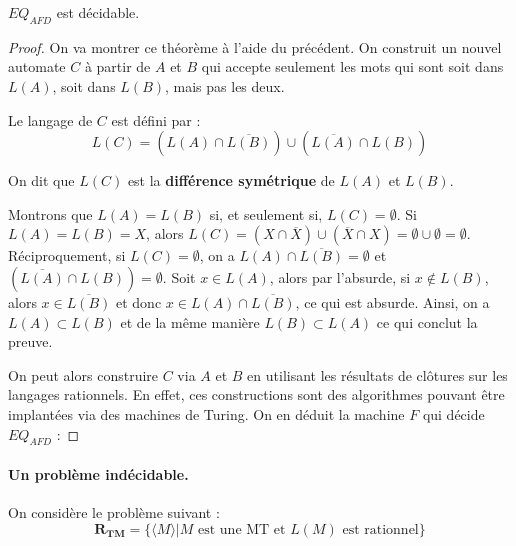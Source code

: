 \begin{theorem}
$EQ_{AFD}$ est décidable.
\end{theorem}

\begin{proof}
On va montrer ce théorème à l'aide du précédent. On construit un nouvel automate $C$ à partir de $A$ et $B$ qui accepte seulement les mots qui sont soit dans $L(A)$, soit dans $L(B)$, mais pas les deux.

Le langage de $C$ est défini par :
$$
L(C)=(L(A) \cap \overline{L(B)}) \cup ( \overline{L(A)} \cap L(B))
$$
\begin{rem}
On dit que $L(C)$ est la \textbf{différence symétrique} de $L(A)$ et $L(B)$.
\end{rem}

Montrons que $L(A)=L(B)$ si, et seulement si, $L(C)=\emptyset$.
Si $L(A)=L(B)=X$, alors $L(C)=(X\cap \overline{X})\cup ( \overline{X} \cap X) = \emptyset \cup \emptyset = \emptyset$. Réciproquement, si $L(C)=\emptyset$, on a $L(A) \cap \overline{L(B)}=\emptyset$ et  $( \overline{L(A)} \cap L(B))=\emptyset$. Soit $x\in L(A)$, alors par l'absurde, si $x\notin L(B)$, alors $x\in \overline{L(B)}$ et donc $x\in L(A) \cap \overline{L(B)}$, ce qui est absurde. Ainsi, on a $L(A)\subset L(B)$ et de la même manière $L(B)\subset L(A)$ ce qui conclut la preuve. 

On peut alors construire $C$ via $A$ et $B$ en utilisant les résultats de clôtures sur les langages rationnels. En effet, ces constructions sont des algorithmes pouvant être implantées via des machines de Turing. On en déduit la machine $F$ qui décide $EQ_{AFD}$ :\newline


\end{proof}


\paragraph{Un problème indécidable.} On considère le problème suivant :
$$
\mathbf{R_{TM}}=\{\langle M \rangle | \text{$M$ est une MT et } L(M) \text{ est rationnel}\}
$$

